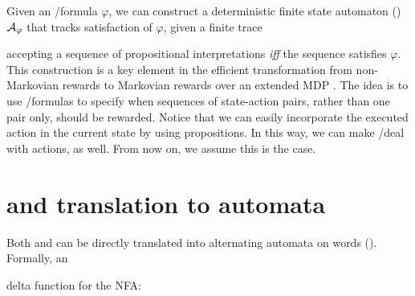 Given an \LTLf/\LDLf formula $\varphi$,
we can construct a deterministic finite state automaton (\DFA) \citep{RaSc59} 
$\mathcal{A}_\varphi$ that tracks satisfaction of $\varphi$, 
given a finite trace

accepting a sequence of propositional interpretations {\em
	iff} the sequence satisfies $\varphi$. This construction
is a key element in the efficient transformation from non-Markovian
rewards to Markovian rewards over an extended MDP \citep{BDP-AAAI18}.
%
The idea is to use \LTLf/\LDLf formulas to specify when sequences of 
state-action pairs, rather than one pair only, should be rewarded.
Notice that we can easily incorporate the executed action in the current state
by using propositions. In this way, we can make \LTLf/\LDLf deal with 
actions, as well. From now on, we assume this is the case.

\section{\LTLf and \LDLf translation to automata}
Both \LTLf and \LDLf can be directly translated into alternating automata on words (\AFW). Formally, an 



delta function for the NFA:





